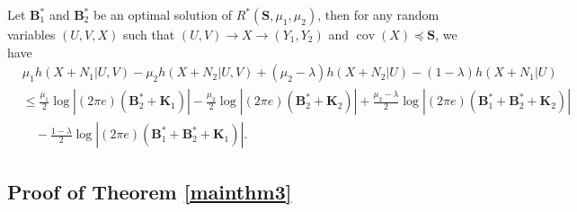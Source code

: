 \documentclass[journal,final, onecolumn]{IEEEtran}
\DeclareMathOperator{\cov}{cov}
\begin{document}
\begin{theorem} \label{mainthm3}
Let $\mathbf{B}_{1}^{*}$ and $\mathbf{B}_{2}^{*}$ be an optimal solution of $R^{*}(\boldsymbol{S}, {\mu_1, \mu_2})$, then for any random variables $(U,V, {X})$ such that $(U,V) \rightarrow {X} \rightarrow ({Y}_{1}, {Y}_{2})$ and $\cov (X) \preceq \boldsymbol{S}$, we have
\begin{align}
& \mu_{1}h({X}+{N}_{1} | U,V) - \mu_{2} h({X}+{N}_{2} | U,V) + (\mu_{2}- \lambda) h({X}+{N}_{2} | U) - (1-\lambda) h({X}+{N}_{1} | U) \nonumber \\
&  \leq  \frac{\mu_{1}}{2} \log \left| (2\pi e) (\boldsymbol{B}_{2}^{*} + \boldsymbol{K}_{1}) \right| - \frac{\mu_{2}}{2} \log \left| (2\pi e) (\boldsymbol{B}_{2}^{*} + \boldsymbol{K}_{2}) \right| + \frac{\mu_{2} - \lambda}{2} \log \left| (2\pi e) (\boldsymbol{B}_{1}^{*}+\boldsymbol{B}_{2}^{*} + \boldsymbol{K}_{2}) \right| \nonumber \\
 &\quad - \frac{1 - \lambda}{2} \log \left| (2\pi e) (\boldsymbol{B}_{1}^{*}+\boldsymbol{B}_{2}^{*} + \boldsymbol{K}_{1}) \right|.\label{eq:m3}
\end{align}
\end{theorem}


\subsection{Proof of Theorem \ref{mainthm3}}
\end{document}
